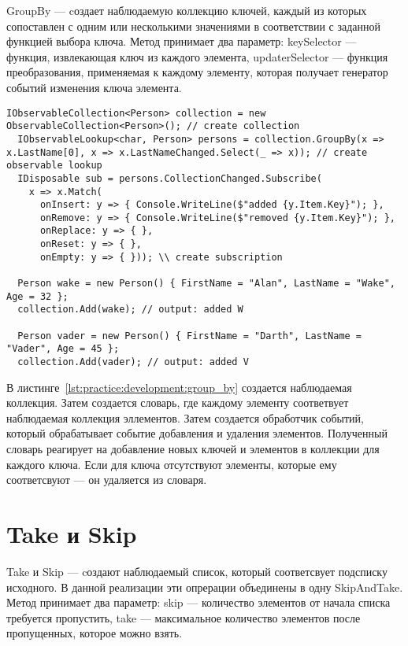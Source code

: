 GroupBy --- cоздает наблюдаемую коллекцию ключей, каждый из которых сопоставлен с одним или несколькими значениями в соответствии с заданной функцией выбора ключа.
Метод принимает два параметр: keySelector --- функция, извлекающая ключ из каждого элемента, updaterSelector --- функция преобразования,
применяемая к каждому элементу, которая получает генератор событий изменения ключа элемента.

\begin{lstlisting}[style=csharpinlinestyle, caption={Пример использования GroupBy}, label=lst:practice:development:group_by]
  IObservableCollection<Person> collection = new ObservableCollection<Person>(); // create collection
  IObservableLookup<char, Person> persons = collection.GroupBy(x => x.LastName[0], x => x.LastNameChanged.Select(_ => x)); // create observable lookup
  IDisposable sub = persons.CollectionChanged.Subscribe(
    x => x.Match(
      onInsert: y => { Console.WriteLine($"added {y.Item.Key}"); },
      onRemove: y => { Console.WriteLine($"removed {y.Item.Key}"); },
      onReplace: y => { },
      onReset: y => { },
      onEmpty: y => { })); \\ create subscription

  Person wake = new Person() { FirstName = "Alan", LastName = "Wake", Age = 32 };
  collection.Add(wake); // output: added W

  Person vader = new Person() { FirstName = "Darth", LastName = "Vader", Age = 45 };
  collection.Add(vader); // output: added V

\end{lstlisting}

В листинге~\ref{lst:practice:development:group_by} создается наблюдаемая коллекция. Затем создается словарь, где каждому элементу соответвует наблюдаемая коллекция эллементов.
Затем создается обработчик событий, который обрабатывает событие добавления и удаления элементов.
Полученный словарь реагирует на добавление новых ключей и элементов в коллекции для каждого ключа. Если для ключа отсутствуют элементы, которые ему соответсвуют --- он удаляется из словаря.

\section{Take и Skip}
\label{sub:development:take_skip}

Take и Skip --- cоздают наблюдаемый список, который соответсвует подсписку исходного. В данной реализации эти опрерации объединены в одну SkipAndTake.
Метод принимает два параметр: skip --- количество элементов от начала списка требуется пропустить, take --- максимальное количество элементов после пропущенных, которое можно взять.

